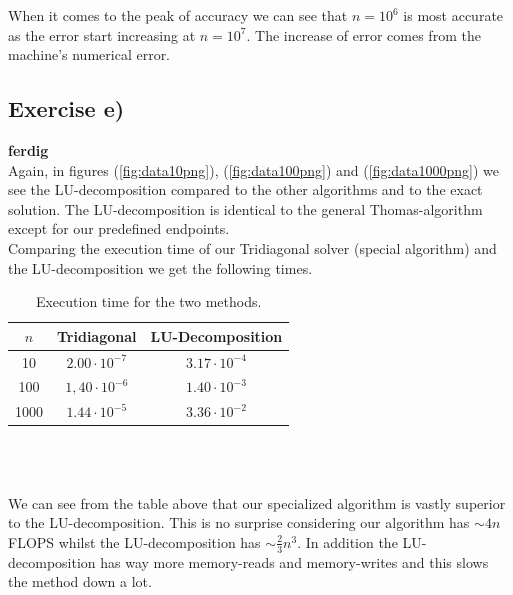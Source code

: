 \documentclass{article}
\begin{document}
  When it comes to the peak of accuracy we can see that $n=10^6$ is most accurate as the error start increasing at $n=10^7$. The increase of error comes from the machine's numerical error.

  \subsection{Exercise e)} \label{sec:Results e)}

  {\bf ferdig} \\

  Again, in figures (\ref{fig:data10png}), (\ref{fig:data100png}) and (\ref{fig:data1000png}) we see the LU-decomposition compared to the other algorithms and to the exact solution. The LU-decomposition is identical to the general Thomas-algorithm except for our predefined endpoints.\\

  Comparing the execution time of our Tridiagonal solver (special algorithm) and the LU-decomposition we get the following times. \\

  \newpage

  \begin{table}[ht] \label{tab:exec_time}
    \centering
      \caption{Execution time for the two methods.}
      \vspace{2mm}
      \begin{tabular}{|c|c|c|}
        \hline
        $n$    &   Tridiagonal      &  LU-Decomposition  \\
        \hline \hline
        10   & $2.00\cdot10^{-7}$ & $3.17\cdot10^{-4}$ \\
        100  & $1,40\cdot10^{-6}$ & $1.40\cdot10^{-3}$ \\
        1000 & $1.44\cdot10^{-5}$ & $3.36\cdot10^{-2}$ \\
        \hline
      \end{tabular} \\
      \hspace{0pt}\\
  \end{table}

  We can see from the table above that our specialized algorithm is vastly superior to the LU-decomposition. This is no surprise considering our algorithm has $\sim4n$ FLOPS whilst the LU-decomposition has $\sim\frac{2}{3}n^3$. In addition the LU-decomposition has way more memory-reads and memory-writes and this slows the method down a lot. \\
\end{document}
